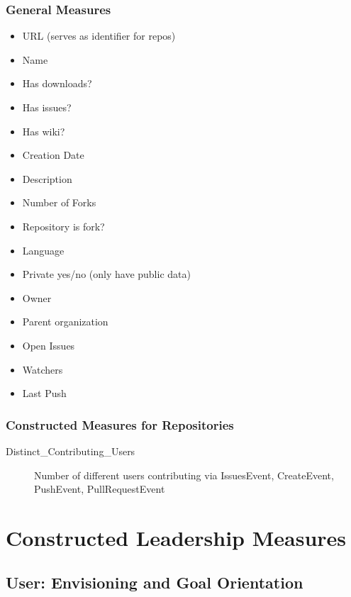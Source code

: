 \documentclass[a4paper,10pt]{article}
\begin{document}
\subsubsection{General Measures}
\begin{itemize}
 \item URL (serves as identifier for repos)
\item Name
\item Has downloads? 
\item Has issues?
\item Has wiki?
\item Creation Date
\item Description
\item Number of Forks
\item Repository is fork?
\item Language
\item Private yes/no (only have public data)
\item Owner
\item Parent organization
\item Open Issues
\item Watchers
\item Last Push
\end{itemize}






\subsubsection{Constructed Measures for Repositories}
\begin{description}
 \item [Distinct\_Contributing\_Users] Number of different users contributing via IssuesEvent, CreateEvent, PushEvent, PullRequestEvent
\end{description}


\section{Constructed Leadership Measures}
\subsection{User: Envisioning and Goal Orientation}
\end{document}
